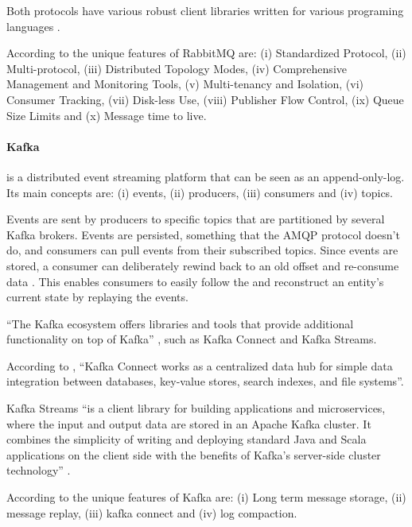 Both protocols have various robust client libraries written for various programing languages \parencite{rabbitmq}. 

According to \cite{10.1145/3093742.3093908} the unique features of RabbitMQ are: (i) Standardized Protocol, (ii) Multi-protocol, (iii) Distributed Topology Modes, (iv) Comprehensive Management and Monitoring Tools, (v) Multi-tenancy and Isolation, (vi) Consumer Tracking, (vii) Disk-less Use, (viii) Publisher Flow Control, (ix) Queue Size Limits and (x) Message time to live.

\paragraph{Kafka}
\label{par:stateofart:arch:infra:mediator:kafka}

 is a distributed event streaming platform that can be seen as an append-only-log. Its main concepts are: (i) events, (ii) producers, (iii) consumers and (iv) topics.

Events are sent by producers to specific topics that are partitioned by several Kafka brokers. Events are persisted, something that the \gls{AMQP} protocol doesn't do, and consumers can pull events from their subscribed topics. Since events are stored, a consumer can deliberately rewind back to an old offset and re-consume data \parencite{pubsubpushpull}. This enables consumers to easily follow the  and reconstruct an entity's current state by replaying the events.

``The Kafka ecosystem offers libraries and tools that provide additional functionality on top of Kafka'' \parencite{10.1145/3093742.3093908}, such as Kafka Connect and Kafka Streams.

According to \cite{kafkaconnect}, ``Kafka Connect works as a centralized data hub for simple data integration between databases, key-value stores, search indexes, and file systems''.

Kafka Streams ``is a client library for building applications and microservices, where the input and output data are stored in an Apache Kafka cluster. It combines the simplicity of writing and deploying standard Java and Scala applications on the client side with the benefits of Kafka's server-side cluster technology'' \parencite{kafkastreams}.

According to \cite{10.1145/3093742.3093908} the unique features of Kafka are: (i) Long term message storage, (ii) message replay, (iii) kafka connect and (iv) log compaction.


